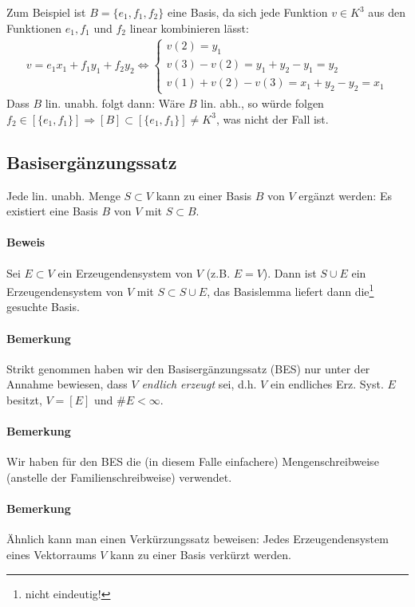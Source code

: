  		Zum Beispiel ist $B=\{e_1,f_1,f_2\}$ eine Basis, da sich jede Funktion $v\in K^3$ aus den Funktionen $e_1,f_1$ und $f_2$ linear kombinieren lässt:
 		\begin{gather*}
 			v=e_1x_1+f_1y_1 + f_2y_2\Leftrightarrow \left\{
 			\begin{array}{l}
 				v(2)=y_1                                   \\
 				v(3) - v(2) = y_1 + y_2 - y_1 = y_2        \\
 				v(1) + v(2) - v(3) = x_1 + y_2 - y_2 = x_1
 			\end{array}
 			\right.
 		\end{gather*}
 		Dass $B$ lin. unabh. folgt dann: Wäre $B$ lin. abh., so würde folgen $f_2\in [\{e_1,f_1\}]\Rightarrow [B] \subset [\{e_1,f_1\}] \neq K^3$, was nicht der Fall ist.

 \subsection{Basisergänzungssatz}
 	\begin{Satz}[Basisergänzungssatz]
 		Jede lin. unabh. Menge $S\subset V$ kann zu einer Basis $B$ von $V$ ergänzt werden: Es existiert eine Basis $B$ von $V$ mit $S\subset B$.
 	\end{Satz}

 	\paragraph{Beweis}
 		Sei $E\subset V$ ein Erzeugendensystem von $V$ (z.B. $E=V$). Dann ist $S\cup E$ ein Erzeugendensystem von $V$ mit $S\subset S\cup E$, das Basislemma liefert dann die\footnote{nicht eindeutig!} gesuchte Basis.

 	\paragraph{Bemerkung}
 		Strikt genommen haben wir den Basisergänzungssatz (BES) nur unter der Annahme bewiesen, dass $V$ \emph{endlich erzeugt} sei, d.h. $V$ ein endliches Erz. Syst. $E$ besitzt, $V=[E]$ und $\#E<\infty$.

 	\paragraph{Bemerkung}
 		Wir haben für den BES die (in diesem Falle einfachere) Mengenschreibweise (anstelle der Familienschreibweise) verwendet.

 	\paragraph{Bemerkung}
 		Ähnlich kann man einen Verkürzungssatz beweisen: Jedes Erzeugendensystem eines Vektorraums $V$ kann zu einer Basis verkürzt werden.

